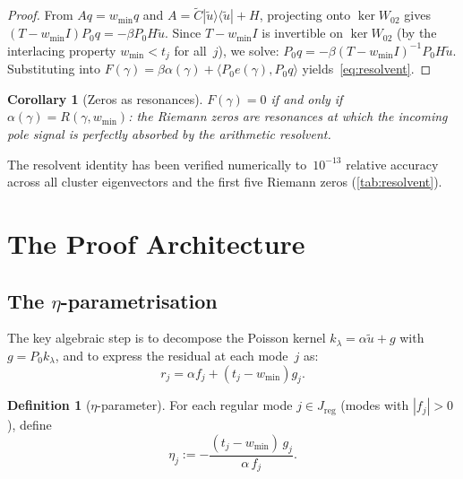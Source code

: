 \documentclass[12pt,a4paper]{article}
\newtheorem{corollary}[theorem]{Corollary}
\theoremstyle{definition}
\newtheorem{definition}[theorem]{Definition}
\theoremstyle{remark}
\newcommand{\reg}{\mathrm{reg}}
\newcommand{\ip}[2]{\langle #1, #2 \rangle}
\newcommand{\utilde}{\tilde{u}}
\newcommand{\Ctilde}{\tilde{C}}
\newcommand{\wmin}{w_{\min}}
\begin{document}
\begin{proof}
From $A q = \wmin q$ and $A = \Ctilde |\utilde\rangle\langle\utilde| + H$,
projecting onto $\ker W_{02}$ gives
$(T - \wmin I) P_0 q = -\beta P_0 H \utilde$.
Since $T - \wmin I$ is invertible on $\ker W_{02}$
(by the interlacing property $\wmin < t_j$ for all~$j$), we solve:
$P_0 q = -\beta (T - \wmin I)^{-1} P_0 H \utilde$.
Substituting into $F(\gamma) = \beta \alpha(\gamma) + \ip{P_0 e(\gamma)}{P_0 q}$
yields~\eqref{eq:resolvent}.
\end{proof}

\begin{corollary}[Zeros as resonances]
$F(\gamma) = 0$ if and only if $\alpha(\gamma) = R(\gamma, \wmin)$:
the Riemann zeros are \emph{resonances} at which the incoming pole
signal is perfectly absorbed by the arithmetic resolvent.
\end{corollary}

The resolvent identity has been verified numerically to~$10^{-13}$
relative accuracy across all cluster eigenvectors and the first five
Riemann zeros (\cref{tab:resolvent}).

\section{The Proof Architecture}
\label{sec:proof-arch}

\subsection{The \texorpdfstring{$\eta$}{eta}-parametrisation}

The key algebraic step is to decompose the Poisson kernel
$k_\lambda = \alpha \utilde + g$ with $g = P_0 k_\lambda$,
and to express the residual at each mode~$j$ as:
\begin{equation}
\label{eq:residual}
r_j = \alpha f_j + (t_j - \wmin) g_j.
\end{equation}

\begin{definition}[$\eta$-parameter]
For each regular mode $j \in J_{\reg}$ (modes with $|f_j| > 0$), define
\begin{equation}
\label{eq:eta-def}
\eta_j := -\frac{(t_j - \wmin)\, g_j}{\alpha\, f_j}.
\end{equation}
\end{definition}
\end{document}
